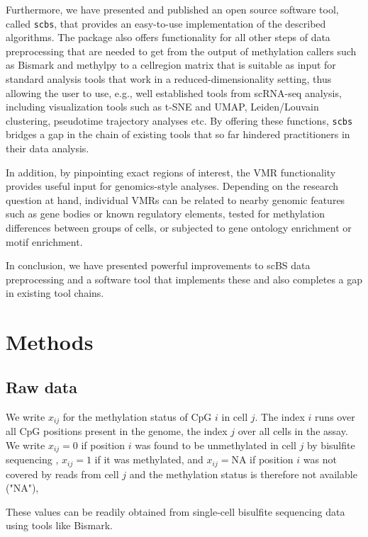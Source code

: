 \documentclass[twocolumn,10pt]{article}
\begin{document}
Furthermore, we have presented and published an open source software tool, called \texttt{scbs}, that provides an easy-to-use implementation of the described algorithms. The package also offers functionality for all other steps of data preprocessing that are needed to get from the output of methylation callers such as Bismark and methylpy to a cell\texttimes region matrix that is suitable as input for standard analysis tools that work in a reduced-dimensionality setting, thus allowing the user to use, e.g., well established tools from scRNA-seq analysis, including visualization tools such as t-SNE and UMAP, Leiden/Louvain clustering, pseudotime trajectory analyses etc. By offering these functions, \texttt{scbs} bridges a gap in the chain of existing tools that so far hindered practitioners in their data analysis.

In addition, by pinpointing exact regions of interest, the VMR functionality provides useful input for genomics-style analyses.
Depending on the research question at hand, individual VMRs can be related to nearby genomic features such as gene bodies or known regulatory elements, tested for methylation differences between groups of cells, or subjected to gene ontology enrichment or motif enrichment.

In conclusion, we have presented powerful improvements to scBS data preprocessing and a software tool that implements these and also completes a gap in existing tool chains.




\section{Methods}

\subsection{Raw data}

We write $x_{ij}$ for the methylation status of CpG $i$ in cell $j$. The index $i$ runs over all CpG positions present in the genome, the index $j$ over all cells in the assay. We write $x_{ij}=0$ if position $i$ was found to be unmethylated in cell $j$ by bisulfite sequencing , $x_{ij}=1$ if it was methylated, and $x_{ij}=\text{NA}$ if position $i$ was not covered by reads from cell $j$ and the methylation status is therefore not available ("NA"),

These values can be readily obtained from single-cell bisulfite sequencing data using tools like Bismark.
\end{document}
